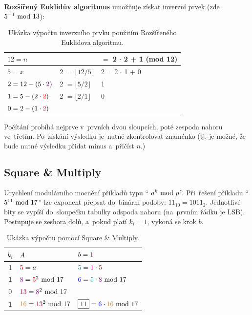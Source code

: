 \vspace*{1em} \noindent
\textbf{Rozšířený Euklidův algoritmus} umožňuje získat inverzní prvek (zde $5^{-1} \ \mathrm{mod}\ 13$):

\begin{table}[ht]
	\centering
\begin{tabular}{ll|l}
	$12 = n$                               & {}                                           & \boxed{\stackrel{?}{\pm} 5} $=$ {\color{violet}2} $\cdot$ {\color{blue}2} + {\color{brown}1} (mod 12) \\
	\hline
	$5 = x$                                & {\color{violet}2} $= \lfloor 12 / 5 \rfloor$ & {\color{blue}2} = {\color{red}2} $\cdot$ {\color{brown}1} + {\color{teal}0} \\
	$2 = 12 - (5 \cdot {\color{violet}2})$ & {\color{red}2}    $= \lfloor 5 / 2 \rfloor$  & {\color{brown}1} \\
	$1 = 5 - (2 \cdot {\color{red}2})$     & {\color{purple}2} $= \lfloor 2 / 1 \rfloor$  & {\color{teal}0} \\
	$0 = 2 - (1 \cdot {\color{purple}2})$  & {}                                           & {}
\end{tabular}
\caption*{Ukázka výpočtu inverzního prvku použitím Rozšířeného Euklidova algoritmu.}
\end{table}

\noindent
Počítání probíhá nejprve v~prvních dvou sloupcích, poté zespoda nahoru ve~třetím. Po~získání výsledku je~nutné zkontrolovat znaménko (tj. je možné, že bude nutné výsledku přidat mínus a~přičíst $n$.)

\subsection{Square \& Multiply}

Urychlení modulárního mocnění příkladů typu \enquote{ $a^k \ \mathrm{mod}\ p$}. Při~řešení příkladu \enquote{$5^{11} \ \mathrm{mod}\ 17$} lze exponent přepsat do~binární podoby: $11_{10} = 1011_2$. Jednotlivé bity se vypíší do~sloupečku tabulky odspoda nahoru (na~prvním řádku je LSB). Postupuje se zeshora dolů, a~pokud platí $k_i = 1$, vykoná se krok $b$.

\begin{table}[ht]
\centering
\begin{tabular}{c|ll}
$k_i$      & $A$                                                & $b = {\color{magenta}1}$ \\
\hline
\textbf{1} & ${\color{red}5} = a$                               & ${\color{teal}5} = {\color{magenta}1} \cdot {\color{red}5}$ \\
\textbf{1} & ${\color{violet}8} = {\color{red}5}^2 \ \mathrm{mod}\ 17$     & ${\color{blue}6} = {\color{teal}5} \cdot {\color{violet}8} \ \mathrm{mod}\ 17$ \\
        0  & ${\color{purple}13} = {\color{violet}8}^2 \ \mathrm{mod}\ 17$ & \\
\textbf{1} & ${\color{brown}16} = {\color{purple}13}^2 \ \mathrm{mod}\ 17$ & $\boxed{11} = {\color{blue}6} \cdot {\color{brown}16} \ \mathrm{mod}\ 17$ \\
\end{tabular}
\caption*{Ukázka výpočtu pomocí Square \& Multiply.}
\end{table} 

